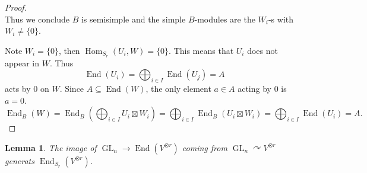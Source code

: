 \documentclass[10pt]{article}
\newtheorem{lemma}{Lemma}[section]
\numberwithin{equation}{theorem}
\DeclareMathOperator{\End}{End}
\DeclareMathOperator{\GL}{GL}
\DeclareMathOperator{\Hom}{Hom}
\begin{document}
\begin{proof}
\begin{equation*}
  \end{equation*}
  Thus we conclude $B$ is semisimple and the simple $B$-modules are the $W_i$-s with $W_i\not=\{0\}$.\\
  \par Note $W_i=\{0\}$, then $\Hom_{S_r}(U_i,W) = \{0\}$. This means that $U_i$ does not appear in $W$. Thus 
  \begin{equation*}
    \End(U_i) = \bigoplus_{i\in I}\End(U_j) = A
  \end{equation*}
  acts by $0$ on $W$. Since $A\subseteq\End(W)$, the only element $a\in A$ acting by $0$ is $a=0$.\\
  \begin{equation*}
    \End_B(W) = \End_B\left(\bigoplus_{i\in I} U_i\boxtimes W_i\right) = \bigoplus_{i\in I}\End_B(U_i\boxtimes W_i) = \bigoplus_{i\in I}\End(U_i) = A.
  \end{equation*}
\end{proof}
\begin{lemma}
  \label{lemma_44}
  The image of $\GL_n\to\End(V^{\otimes r})$ coming from $\GL_n\curvearrowright V^{\otimes r}$ generats $\End_{S_r}(V^{\otimes r})$.
\end{lemma}
\end{document}
